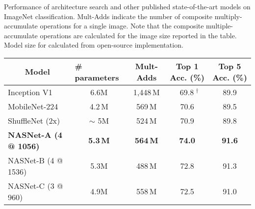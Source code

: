 \documentclass[10pt,twocolumn,letterpaper]{article}
\begin{document}
\begin{table*}[h!]
\vspace{0.2cm}
\caption{Performance of architecture search and other published state-of-the-art models on ImageNet classification. Mult-Adds indicate the number of composite multiply-accumulate operations for a single image. Note that the composite multiple-accumulate operations are calculated for the image size reported in the table. Model size for \cite{hu2017squeeze} calculated from open-source implementation.}
\label{tab:imagenet}
\end{table*}\begin{table*}[h!]
\centering
\small
\begin{tabular}{l|cc|cc}
\toprule
\multicolumn{1}{c|}{\bf Model} & \multicolumn{1}{l}{\bf \# parameters} & \bf Mult-Adds & \bf Top 1 Acc. (\%) & \bf Top 5 Acc. (\%)  \\ \midrule
Inception V1~\cite{szegedy2015going} & 6.6M & 1,448\,M & $\;\;$69.8$\;^{\dagger}$ & 89.9 \\
MobileNet-224 \cite{howard2017mobilenets} & 4.2\,M & 569\,M & 70.6 & 89.5  \\
ShuffleNet (2x) \cite{shufflenet} & $\sim$ 5M & 524\,M & 70.9 & 89.8 \\
\midrule
\textbf{NASNet-A (4 @ 1056)} & \textbf{5.3\,M} & \textbf{564\,M} & \textbf{74.0} & \textbf{91.6} \\
NASNet-B (4 @ 1536) & 5.3M & 488\,M & 72.8 & 91.3  \\
NASNet-C (3 @ 960) & 4.9M & 558\,M & 72.5 & 91.0  \\
\bottomrule
\end{tabular}


\end{table*}
\end{document}
